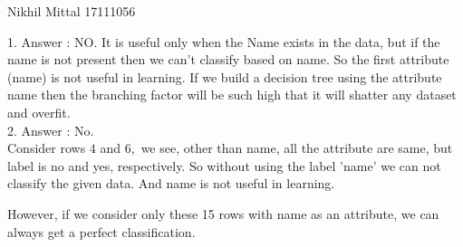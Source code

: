 \documentclass[a4paper,11pt]{article}
\begin{document}
                {Nikhil Mittal}                               %
                {17111056}                                    %

\begin{mlsolution}

1. Answer : NO. It is useful only when the Name exists in the data, but if the name is not present then we can't classify based on name. So the first attribute (name) is not useful in learning.
If we build a decision tree using the attribute name then the branching factor will be such high that it will shatter any dataset and overfit.
\\

2. Answer : No.\\
    
    Consider rows $4$ and $6$,\
    we see, other than name, all the attribute are same, but label is no and yes, respectively.
    So without using the label 'name' we can not classify the given data. And name is not useful in learning.
    
    However, if we consider only these 15 rows with name as an attribute, we can always get a perfect classification.


\end{mlsolution}
\end{document}
